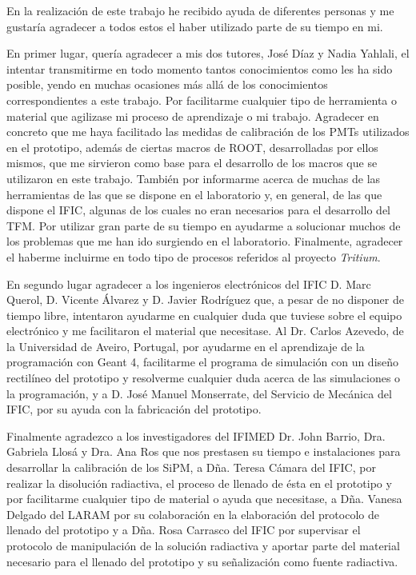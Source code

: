 En la realización de este trabajo he recibido ayuda de diferentes personas y me gustaría agradecer a todos estos el haber utilizado parte de su tiempo en mi.

En primer lugar, quería agradecer a mis dos tutores, José Díaz y Nadia Yahlali, el intentar transmitirme en todo momento tantos conocimientos como les ha sido posible, yendo en muchas ocasiones más allá de los conocimientos correspondientes a este trabajo. Por facilitarme cualquier tipo de herramienta o material que agilizase mi proceso de aprendizaje o mi trabajo. Agradecer en concreto que me haya facilitado las medidas de calibración de los PMTs utilizados en el prototipo, además de ciertas macros de ROOT, desarrolladas por ellos mismos, que me sirvieron como base para el desarrollo de los macros que se utilizaron en este trabajo. También por informarme acerca de muchas de las herramientas de las que se dispone en el laboratorio y, en general, de las que dispone el IFIC, algunas de los cuales no eran necesarios para el desarrollo del TFM. Por utilizar gran parte de su tiempo en ayudarme a solucionar muchos de los problemas que me han ido surgiendo en el laboratorio. Finalmente, agradecer el haberme incluirme en todo tipo de procesos referidos al proyecto \textit{Tritium}. 



En segundo lugar agradecer a los ingenieros electrónicos  del IFIC D. Marc Querol, D. Vicente Álvarez  y D. Javier Rodríguez que, a pesar de no disponer de tiempo libre, intentaron ayudarme en cualquier duda que tuviese sobre el equipo electrónico y me  facilitaron el material que necesitase.  Al Dr.  Carlos Azevedo, de la Universidad de Aveiro, Portugal, por ayudarme en el aprendizaje de la programación con Geant 4, facilitarme el programa de simulación con un diseño rectilíneo del prototipo y resolverme cualquier duda acerca de las simulaciones o la programación, y a  D.  José Manuel Monserrate, del Servicio de Mecánica del IFIC, por su ayuda con la fabricación del prototipo.

Finalmente agradezco a los investigadores del IFIMED  Dr. John Barrio, Dra. Gabriela Llosá y Dra. Ana Ros que nos prestasen su tiempo e instalaciones para desarrollar la calibración de los SiPM, a  Dña. Teresa Cámara del IFIC,  por realizar la disolución radiactiva, el proceso de llenado de ésta en el prototipo y por facilitarme cualquier tipo de material o ayuda que necesitase, a Dña. Vanesa Delgado  del LARAM por su colaboración en la elaboración del protocolo de llenado del prototipo y  a Dña. Rosa Carrasco del IFIC por supervisar el protocolo de manipulación de la solución radiactiva y aportar parte del material necesario para el llenado del prototipo y su señalización como fuente radiactiva.